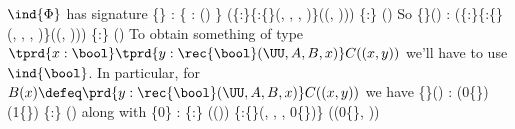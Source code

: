 $\ind{\Phi}$ has signature
  \{\} :
  \{ : ()  \}
  (\{:\}\{:\{\}(, , , )\}((, )))
  \{:\} ()
So
  \{\}() : 
  (\{:\}\{:\{\}(, , , )\}((, )))
  \{:\} ()
To obtain something of type $\tprd{x:\bool}\tprd{y:\rec{\bool}(\UU, A, B,
  x)}C((x, y))$ we'll have to use $\ind{\bool}$.  In particular, for $B(x)
\defeq\prd{y:\rec{\bool}(\UU, A, B, x)}C((x, y))$ we have
  \{\}()
  :
  (0\coqdocvar{\_}\{\})
  (1\coqdocvar{\_}\{\})
  \{:\}
  ()
along with
  \{0\} :
  \{:\} (())
  \{:\{\}(, , , 0\coqdocvar{\_}\{\})\} ((0\coqdocvar{\_}\{\}, ))
